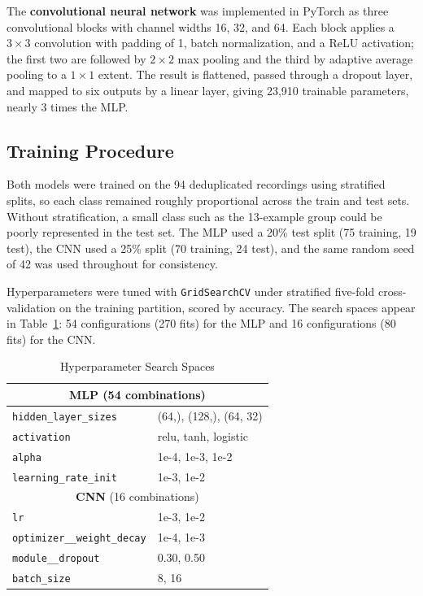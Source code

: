 \documentclass[conference]{IEEEtran}
\begin{document}
The \textbf{convolutional neural network} was implemented in PyTorch as
three convolutional blocks with channel widths 16, 32, and 64. Each block applies
a $3 \times 3$ convolution with padding of 1, batch normalization, and a ReLU
activation; the first two are followed by $2 \times 2$ max pooling and the third
by adaptive average pooling to a $1 \times 1$ extent. The result is flattened,
passed through a dropout layer, and mapped to six outputs by a linear layer,
giving 23{,}910 trainable parameters, nearly 3 times the MLP.

\subsection{Training Procedure}
Both models were trained on the 94 deduplicated recordings using stratified
splits, so each class remained roughly proportional across the train and test
sets. Without stratification, a small class such as the 13-example group could
be poorly represented in the test set. The MLP used a 20\% test split (75
training, 19 test), the CNN used a 25\% split (70 training, 24 test), and the
same random seed of 42 was used throughout for consistency.

Hyperparameters were tuned with \texttt{GridSearchCV} under stratified five-fold
cross-validation on the training partition, scored by accuracy. The search spaces
appear in Table~\ref{tab:grids}: 54 configurations (270 fits) for the MLP and 16
configurations (80 fits) for the CNN.

\begin{table}[htbp]
\caption{Hyperparameter Search Spaces}
\begin{center}
\begin{tabular}{ll}
\hline
\multicolumn{2}{c}{\textbf{MLP} (54 combinations)} \\
\hline
\texttt{hidden\_layer\_sizes} & (64,), (128,), (64, 32) \\
\texttt{activation} & relu, tanh, logistic \\
\texttt{alpha} & 1e-4, 1e-3, 1e-2 \\
\texttt{learning\_rate\_init} & 1e-3, 1e-2 \\
\hline
\multicolumn{2}{c}{\textbf{CNN} (16 combinations)} \\
\hline
\texttt{lr} & 1e-3, 1e-2 \\
\texttt{optimizer\_\_weight\_decay} & 1e-4, 1e-3 \\
\texttt{module\_\_dropout} & 0.30, 0.50 \\
\texttt{batch\_size} & 8, 16 \\
\hline
\end{tabular}
\label{tab:grids}
\end{center}
\end{table}
\end{document}
